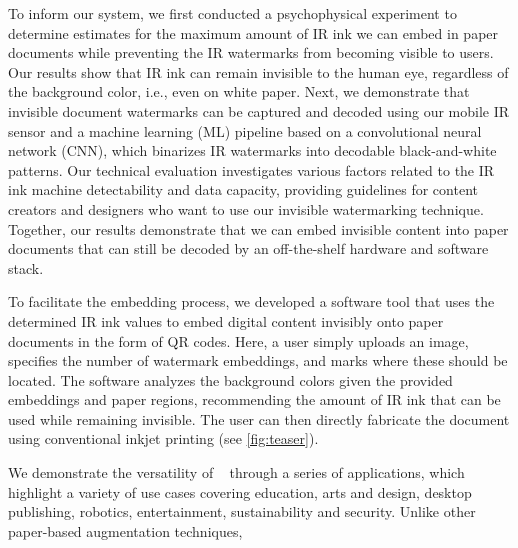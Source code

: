 To inform our system, we first conducted a psychophysical experiment to determine estimates for the maximum amount of IR ink we can embed in paper documents while preventing the IR watermarks from becoming visible to users.
Our results show that IR ink can remain invisible to the human eye, regardless of the background color, i.e., even on white paper. 
Next, we demonstrate that invisible document watermarks can be captured and decoded using our mobile IR sensor and a machine learning (ML) pipeline based on a convolutional neural network (CNN), which binarizes IR watermarks into decodable black-and-white patterns.
Our technical evaluation investigates various factors related to the IR ink machine detectability and data capacity, providing guidelines for content creators and designers who want to use our invisible watermarking technique.  
Together, our results demonstrate that we can embed invisible content into paper documents that can still be decoded by an off-the-shelf hardware and software stack.

To facilitate the embedding process, we developed a software tool that uses the determined IR ink values to embed digital content invisibly onto paper documents in the form of QR codes. 
Here, a user simply uploads an image, specifies the number of watermark embeddings, and marks where these should be located. The software analyzes the background colors given the provided embeddings and paper regions, recommending the amount of IR ink that can be used while remaining invisible. The user can then directly fabricate the document using conventional inkjet printing (see \autoref{fig:teaser}). 

We demonstrate the versatility of \systemName~ through a series of applications, which highlight a variety of use cases covering education, arts and design, desktop publishing, robotics, entertainment, sustainability and security.
Unlike other paper-based augmentation techniques, 


